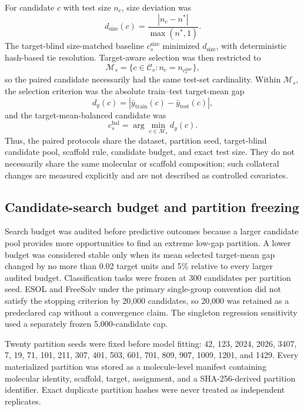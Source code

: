 For candidate $c$ with test size $n_c$, size deviation was
\begin{equation}
 d_{\mathrm{size}}(c)=\frac{|n_c-n^*|}{\max(n^*,1)}.
 \label{eq:size-deviation}
\end{equation}
The target-blind size-matched baseline $c_s^{\mathrm{size}}$ minimized $d_{\mathrm{size}}$, with deterministic hash-based tie resolution. Target-aware selection was then restricted to
\begin{equation}
 \mathcal{M}_s=\{c\in\mathcal{C}_s:n_c=n_{c_s^{\mathrm{size}}}\},
\end{equation}
so the paired candidate necessarily had the same test-set cardinality. Within $\mathcal{M}_s$, the selection criterion was the absolute train--test target-mean gap
\begin{equation}
 d_y(c)=\left|\bar y_{\mathrm{train}}(c)-\bar y_{\mathrm{test}}(c)\right|,
 \label{eq:target-gap}
\end{equation}
and the target-mean-balanced candidate was
\begin{equation}
 c_s^{\mathrm{bal}}=\arg\min_{c\in\mathcal{M}_s}d_y(c).
 \label{eq:paired-balance}
\end{equation}
Thus, the paired protocols share the dataset, partition seed, target-blind candidate pool, scaffold rule, candidate budget, and exact test size. They do not necessarily share the same molecular or scaffold composition; such collateral changes are measured explicitly and are not described as controlled covariates.

\subsection{Candidate-search budget and partition freezing}

Search budget was audited before predictive outcomes because a larger candidate pool provides more opportunities to find an extreme low-gap partition. A lower budget was considered stable only when its mean selected target-mean gap changed by no more than 0.02 target units and 5\% relative to every larger audited budget. Classification tasks were frozen at 300 candidates per partition seed. ESOL and FreeSolv under the primary single-group convention did not satisfy the stopping criterion by 20,000 candidates, so 20,000 was retained as a predeclared cap without a convergence claim. The singleton regression sensitivity used a separately frozen 5,000-candidate cap.

Twenty partition seeds were fixed before model fitting: 42, 123, 2024, 2026, 3407, 7, 19, 71, 101, 211, 307, 401, 503, 601, 701, 809, 907, 1009, 1201, and 1429. Every materialized partition was stored as a molecule-level manifest containing molecular identity, scaffold, target, assignment, and a SHA-256-derived partition identifier. Exact duplicate partition hashes were never treated as independent replicates.


